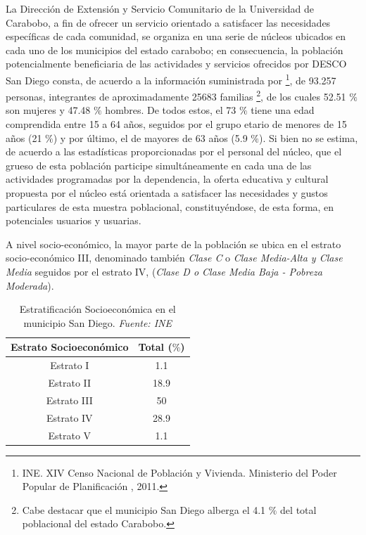 \documentclass[11pt, a4paper, twosides]{report}
\begin{document}
La Dirección de Extensión y Servicio Comunitario de la Universidad de Carabobo, a fin de ofrecer un servicio orientado a satisfacer las necesidades específicas de cada comunidad, se organiza en una serie de núcleos ubicados en cada uno de los municipios del estado carabobo; en consecuencia, la población potencialmente beneficiaria de las actividades y servicios ofrecidos por DESCO San Diego consta, de acuerdo a la información suministrada por \footnote{INE. XIV  Censo  Nacional  de  Población  y Vivienda. Ministerio del Poder Popular de Planificación , 2011.}, de 93.257 personas, integrantes de aproximadamente 25683 familias \footnote{Cabe destacar que el municipio San Diego alberga el 4.1 $\%$ del total poblacional del estado Carabobo.}, de los cuales 52.51 $\%$ son mujeres y 47.48 $\%$ hombres. De todos estos, el 73 $\%$ tiene una edad comprendida entre 15 a 64 años, seguidos por el grupo etario de menores de 15 años (21 $\%$) y por último, el de mayores de 63 años (5.9 $\%$). Si bien no se estima, de acuerdo a las estadísticas proporcionadas por el personal del núcleo, que el grueso de esta población participe simultáneamente en cada una de las actividades programadas por la dependencia, la oferta educativa y cultural propuesta por el núcleo está orientada a satisfacer las necesidades y gustos particulares de esta muestra poblacional, constituyéndose, de esta forma, en potenciales usuarios y usuarias. 

A nivel socio-económico, la mayor parte de la población se ubica en el estrato socio-económico III, denominado también \textit{Clase C} o \textit{Clase Media-Alta y Clase Media} seguidos por el estrato IV, (\textit{Clase D o \textit{Clase Media Baja - Pobreza Moderada}}).

\begin{table}[h]
	\centering
	\begin{tabular}{|c|c|}
		\hline
		\cellcolor{gray75} \textbf{Estrato Socioeconómico} & \cellcolor{gray75} \textbf{Total ($\%$)} \\ \hline
		Estrato I & 1.1 \\ \hline
		Estrato II  & 18.9 \\ \hline
		Estrato III & 50 \\ \hline
		Estrato IV & 28.9 \\ \hline
		Estrato V & 1.1 \\ \hline
	\end{tabular}
	\caption{Estratificación Socioeconómica en el municipio San Diego. \textit{Fuente: INE}}
	\label{tabla1}
\end{table}
\end{document}
